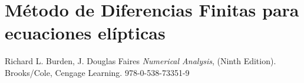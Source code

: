 \documentclass[a4paper]{article}
\begin{document}
\section{Método de Diferencias Finitas para ecuaciones elípticas}



\begin{thebibliography}{99}


 Richard L. Burden, J. Douglas Faires \textit{Numerical Analysis}, (Ninth Edition). Brooks/Cole, Cengage Learning. 978-0-538-73351-9






\end{thebibliography}
\end{document}
